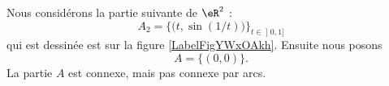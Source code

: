 \newcommand{\CaptionFigYWxOAkh}{La figure de la proposition \ref{PROPooVXDNooPZYKPr}.}


\begin{proposition}     \label{PROPooVXDNooPZYKPr}
	Nous considérons la partie suivante de \( \eR^2\) :
	\begin{equation}
		A_2=\big\{   \big( t,\sin(1/t) \big)   \big\}_{t\in \mathopen] 0 , 1 \mathclose]}
	\end{equation}
	qui est dessinée est sur la figure \ref{LabelFigYWxOAkh}. Ensuite nous posons
	\begin{equation}
		A=\big\{  (0,0)  \big\}.
	\end{equation}
	La partie \( A\) est connexe, mais pas connexe par arcs.
\end{proposition}

